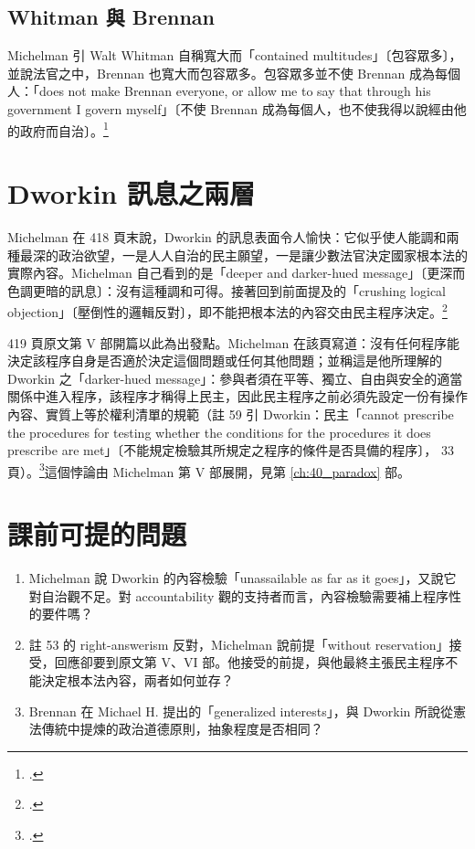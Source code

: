 \subsection{Whitman 與 Brennan}

Michelman 引 Walt Whitman 自稱寬大而「contained multitudes」〔包容眾多〕，並說法官之中，Brennan 也寬大而包容眾多。包容眾多並不使 Brennan 成為每個人：「does not make Brennan everyone, or allow me to say that through his government I govern myself」〔不使 Brennan 成為每個人，也不使我得以說經由他的政府而自治〕。\footcite[418]{michelman1998}

\section{Dworkin 訊息之兩層}
\label{sec:30_dworkin-7}

Michelman 在 418 頁末說，Dworkin 的訊息表面令人愉快：它似乎使人能調和兩種最深的政治欲望，一是人人自治的民主願望，一是讓少數法官決定國家根本法的實際內容。Michelman 自己看到的是「deeper and darker-hued message」〔更深而色調更暗的訊息〕：沒有這種調和可得。接著回到前面提及的「crushing logical objection」〔壓倒性的邏輯反對〕，即不能把根本法的內容交由民主程序決定。\footcite[418--419]{michelman1998}

419 頁原文第 V 部開篇以此為出發點。Michelman 在該頁寫道：沒有任何程序能決定該程序自身是否適於決定這個問題或任何其他問題；並稱這是他所理解的 Dworkin 之「darker-hued message」：參與者須在平等、獨立、自由與安全的適當關係中進入程序，該程序才稱得上民主，因此民主程序之前必須先設定一份有操作內容、實質上等於權利清單的規範（註 59 引 Dworkin：民主「cannot prescribe the procedures for testing whether the conditions for the procedures it does prescribe are met」〔不能規定檢驗其所規定之程序的條件是否具備的程序〕， 33 頁）。\footcite[419 \& n.59]{michelman1998}這個悖論由 Michelman 第 V 部展開，見第 \ref{ch:40_paradox} 部。

\section{課前可提的問題}
\label{sec:30_dworkin-8}

\begin{enumerate}
\tightlist
\item Michelman 說 Dworkin 的內容檢驗「unassailable as far as it goes」，又說它對自治觀不足。對 accountability 觀的支持者而言，內容檢驗需要補上程序性的要件嗎？
\item 註 53 的 right-answerism 反對，Michelman 說前提「without reservation」接受，回應卻要到原文第 V、VI 部。他接受的前提，與他最終主張民主程序不能決定根本法內容，兩者如何並存？
\item Brennan 在 Michael H. 提出的「generalized interests」，與 Dworkin 所說從憲法傳統中提煉的政治道德原則，抽象程度是否相同？
\end{enumerate}
